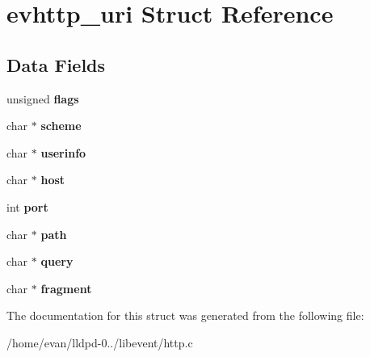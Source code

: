 \section{evhttp\-\_\-uri \-Struct \-Reference}
\label{structevhttp__uri}
\subsection*{\-Data \-Fields}
\begin{DoxyCompactItemize}
\item 
unsigned {\bfseries flags}\label{structevhttp__uri_a8b08a4d2ec878257d64c55f64a62242c}

\item 
char $\ast$ {\bfseries scheme}\label{structevhttp__uri_ac386fe0902e2c7802ee782d8aaca75e5}

\item 
char $\ast$ {\bfseries userinfo}\label{structevhttp__uri_a8d35a6b418d329a0c7242bfeda586e75}

\item 
char $\ast$ {\bfseries host}\label{structevhttp__uri_a1c2046dcb30a629d6d9f45ff8f403f12}

\item 
int {\bfseries port}\label{structevhttp__uri_a63c89c04d1feae07ca35558055155ffb}

\item 
char $\ast$ {\bfseries path}\label{structevhttp__uri_a44196e6a5696d10442c29e639437196e}

\item 
char $\ast$ {\bfseries query}\label{structevhttp__uri_af26982218484ec3fdcb8f7d92e864a9b}

\item 
char $\ast$ {\bfseries fragment}\label{structevhttp__uri_a5abc7cb9044d6e0c2d6206c8abb00dfa}

\end{DoxyCompactItemize}


\-The documentation for this struct was generated from the following file\-:\begin{DoxyCompactItemize}
\item 
/home/evan/lldpd-\/0../libevent/http.\-c\end{DoxyCompactItemize}
